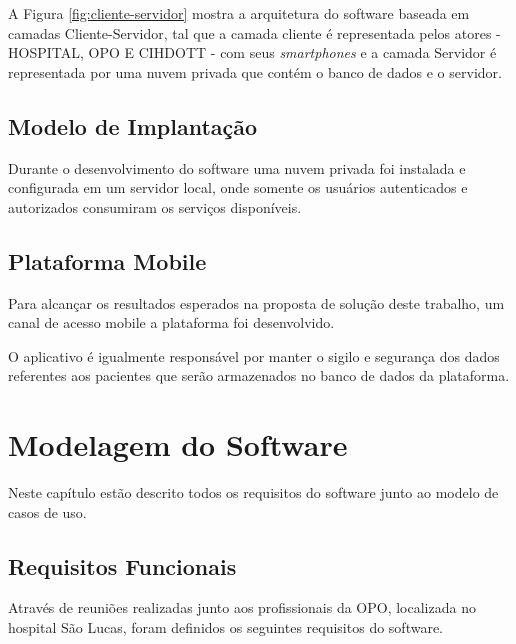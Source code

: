 \documentclass[portuguese,oneside]{tcc}
\begin{document}
A Figura \ref{fig:cliente-servidor} mostra a arquitetura do software baseada em camadas Cliente-Servidor, tal que a camada cliente é representada pelos atores - HOSPITAL, OPO E CIHDOTT - com seus \textit{smartphones} e a camada Servidor é representada por uma nuvem privada que contém o banco de dados e o servidor.


\section{Modelo de Implantação}
Durante o desenvolvimento do software uma nuvem privada foi instalada e configurada em um servidor local, onde somente os usuários autenticados e autorizados consumiram os serviços disponíveis.

\section{Plataforma Mobile}

Para alcançar os resultados esperados na proposta de solução deste trabalho, um canal de acesso mobile a plataforma foi desenvolvido.
 

O aplicativo é igualmente responsável por manter o sigilo e segurança dos dados referentes aos pacientes que serão armazenados no banco de dados da plataforma.

\chapter{Modelagem do Software}
Neste capítulo estão descrito todos os requisitos do software junto ao modelo de casos de uso.

\section{Requisitos Funcionais}
Através de reuniões realizadas junto aos profissionais da OPO, localizada no hospital São Lucas, foram definidos os seguintes requisitos do software.
\end{document}

